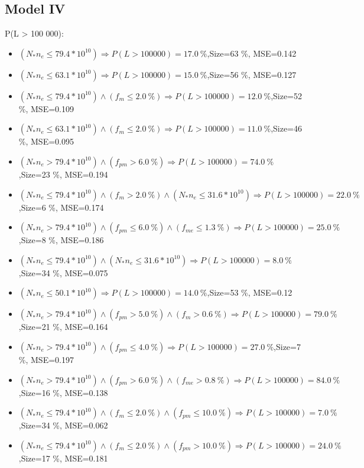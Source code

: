 \documentclass[numbered]{CSL}
\begin{document}
\subsection{Model IV}
P(L > 100 000):
\begin{itemize}
\item $(N_* n_e \leq 79.4 * 10^{10}) \Rightarrow P(L > 100 000) = 17.0~\%$,\hfill Size=63 \%, MSE=0.142
\item $(N_* n_e \leq 63.1 * 10^{10}) \Rightarrow P(L > 100 000) = 15.0~\%$,\hfill Size=56 \%, MSE=0.127
\item $(N_* n_e \leq 79.4 * 10^{10}) \land (f_m \leq 2.0~\%) \Rightarrow P(L > 100 000) = 12.0~\%$,\hfill Size=52 \%, MSE=0.109
\item $(N_* n_e \leq 63.1 * 10^{10}) \land (f_m \leq 2.0~\%) \Rightarrow P(L > 100 000) = 11.0~\%$,\hfill Size=46 \%, MSE=0.095
\item $(N_* n_e > 79.4 * 10^{10}) \land (f_{pm} > 6.0~\%) \Rightarrow P(L > 100 000) = 74.0~\%$,\hfill Size=23 \%, MSE=0.194
\item $(N_* n_e \leq 79.4 * 10^{10}) \land (f_m > 2.0~\%) \land (N_* n_e \leq 31.6 * 10^{10}) \Rightarrow P(L > 100 000) = 22.0~\%$,\hfill Size=6 \%, MSE=0.174
\item $(N_* n_e > 79.4 * 10^{10}) \land (f_{pm} \leq 6.0~\%) \land (f_{me} \leq 1.3~\%) \Rightarrow P(L > 100 000) = 25.0~\%$,\hfill Size=8 \%, MSE=0.186
\item $(N_* n_e \leq 79.4 * 10^{10}) \land (N_* n_e \leq 31.6 * 10^{10}) \Rightarrow P(L > 100 000) = 8.0~\%$,\hfill Size=34 \%, MSE=0.075
\item $(N_* n_e \leq 50.1 * 10^{10}) \Rightarrow P(L > 100 000) = 14.0~\%$,\hfill Size=53 \%, MSE=0.12
\item $(N_* n_e > 79.4 * 10^{10}) \land (f_{pm} > 5.0~\%) \land (f_m > 0.6~\%) \Rightarrow P(L > 100 000) = 79.0~\%$,\hfill Size=21 \%, MSE=0.164
\item $(N_* n_e > 79.4 * 10^{10}) \land (f_{pm} \leq 4.0~\%) \Rightarrow P(L > 100 000) = 27.0~\%$,\hfill Size=7 \%, MSE=0.197
\item $(N_* n_e > 79.4 * 10^{10}) \land (f_{pm} > 6.0~\%) \land (f_{me} > 0.8~\%) \Rightarrow P(L > 100 000) = 84.0~\%$,\hfill Size=16 \%, MSE=0.138
\item $(N_* n_e \leq 79.4 * 10^{10}) \land (f_m \leq 2.0~\%) \land (f_{pm} \leq 10.0~\%) \Rightarrow P(L > 100 000) = 7.0~\%$,\hfill Size=34 \%, MSE=0.062
\item $(N_* n_e \leq 79.4 * 10^{10}) \land (f_m \leq 2.0~\%) \land (f_{pm} > 10.0~\%) \Rightarrow P(L > 100 000) = 24.0~\%$,\hfill Size=17 \%, MSE=0.181

\end{itemize}
\end{document}
